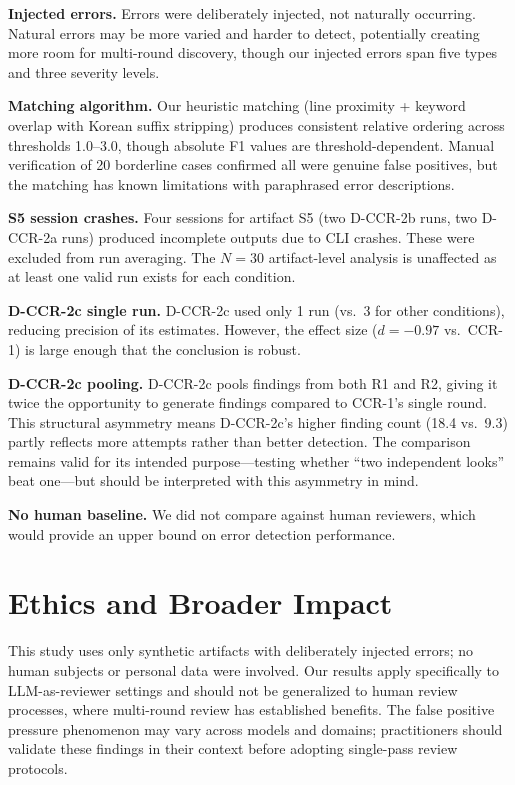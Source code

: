 \documentclass[11pt]{article}
\begin{document}
\textbf{Injected errors.} Errors were deliberately injected, not naturally occurring.
Natural errors may be more varied and harder to detect, potentially creating more room for multi-round discovery, though our injected errors span five types and three severity levels.

\textbf{Matching algorithm.} Our heuristic matching (line proximity + keyword overlap with Korean suffix stripping) produces consistent relative ordering across thresholds 1.0--3.0, though absolute F1 values are threshold-dependent.
Manual verification of 20 borderline cases confirmed all were genuine false positives, but the matching has known limitations with paraphrased error descriptions.

\textbf{S5 session crashes.} Four sessions for artifact S5 (two D-CCR-2b runs, two D-CCR-2a runs) produced incomplete outputs due to CLI crashes.
These were excluded from run averaging.
The $N = 30$ artifact-level analysis is unaffected as at least one valid run exists for each condition.

\textbf{D-CCR-2c single run.} D-CCR-2c used only 1 run (vs.\ 3 for other conditions), reducing precision of its estimates.
However, the effect size ($d = -0.97$ vs.\ CCR-1) is large enough that the conclusion is robust.

\textbf{D-CCR-2c pooling.} D-CCR-2c pools findings from both R1 and R2, giving it twice the opportunity to generate findings compared to CCR-1's single round.
This structural asymmetry means D-CCR-2c's higher finding count (18.4 vs.\ 9.3) partly reflects more attempts rather than better detection.
The comparison remains valid for its intended purpose---testing whether ``two independent looks'' beat one---but should be interpreted with this asymmetry in mind.

\textbf{No human baseline.} We did not compare against human reviewers, which would provide an upper bound on error detection performance.

\section{Ethics and Broader Impact}

This study uses only synthetic artifacts with deliberately injected errors; no human subjects or personal data were involved.
Our results apply specifically to LLM-as-reviewer settings and should not be generalized to human review processes, where multi-round review has established benefits.
The false positive pressure phenomenon may vary across models and domains; practitioners should validate these findings in their context before adopting single-pass review protocols.
\end{document}
